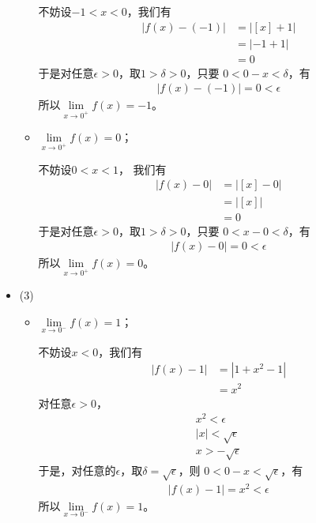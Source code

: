 \documentclass{article}
\begin{document}
\begin{itemize}
\begin{itemize}
                不妨设$-1 < x < 0$，我们有
                \begin{align*}
                  |f(x) - (-1)|
                   & = |[x] + 1| \\
                   & = |-1 + 1|  \\
                   & = 0
                \end{align*}
                于是对任意$\epsilon > 0$，取$1 > \delta > 0$，只要
                $0 < 0 - x < \delta$，有
                \begin{align*}
                  |f(x) - (-1)| = 0 < \epsilon
                \end{align*}
                所以$\lim\limits_{x \to 0^{+}} f(x) = -1$。

          \item $\lim\limits_{x \to 0^{+}} f(x) = 0$；

                不妨设$0 < x < 1$， 我们有
                \begin{align*}
                  |f(x) - 0|
                   & = |[x] - 0| \\
                   & = |[x]|     \\
                   & = 0
                \end{align*}
                于是对任意$\epsilon > 0$，取$1 > \delta > 0$，只要
                $0 < x - 0 < \delta$，有
                \begin{align*}
                  |f(x) - 0| = 0 < \epsilon
                \end{align*}
                所以$\lim\limits_{x \to 0^{+}} f(x) = 0$。
        \end{itemize}

  \item (3)

        \begin{itemize}
          \item  $\lim\limits_{x \to 0^{-}} f(x) = 1$；

                不妨设$x < 0$，我们有
                \begin{align*}
                  |f(x) - 1|
                   & = |1 + x^2 - 1| \\
                   & = x^2
                \end{align*}
                对任意$\epsilon > 0$，
                \begin{align*}
                  x^2 < \epsilon        \\
                  |x| < \sqrt{\epsilon} \\
                  x > - \sqrt{\epsilon}
                \end{align*}
                于是，对任意的$\epsilon$，取$\delta = \sqrt{\epsilon}$，则
                $0 < 0 - x < \sqrt{\epsilon}$，有
                \begin{align*}
                  |f(x) - 1| = x^2 < \epsilon
                \end{align*}
                所以$\lim\limits_{x \to 0^{-}} f(x) = 1$。


\end{itemize}
\end{itemize}
\end{document}
